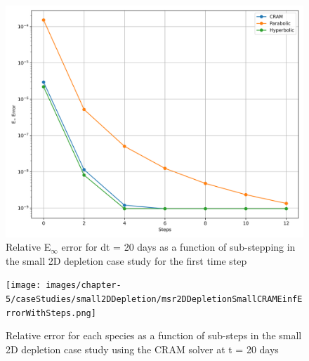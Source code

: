 \begin{figure}[p]
    \centering
    \includegraphics[width=5in]{images/chapter-5/caseStudies/small2DDepletion/msrSmall2DDepletionEinfErrorerrorWithSteps.png}
    \caption{Relative E$_{\infty}$ error for dt = 20 days as a function of sub-stepping in the small 2D depletion case study for the first time step}
    \label{fig:small_2D_depletion_Einf_with_substeps}
\end{figure}

\clearpage

\begin{landscape}
\thispagestyle{mylandscape}
\begin{figure}[p]
    \centering
    \texttt{[image: images/chapter-5/caseStudies/small2DDepletion/msr2DDepletionSmallCRAMEinfErrorWithSteps.png]}
    \caption{Relative error for each species as a function of sub-steps in the small 2D depletion case study using the CRAM solver at t = 20 days}
    \label{fig:small_2D_depletion_Einf_species_with_substeps}
\end{figure}
\end{landscape}

\clearpage

